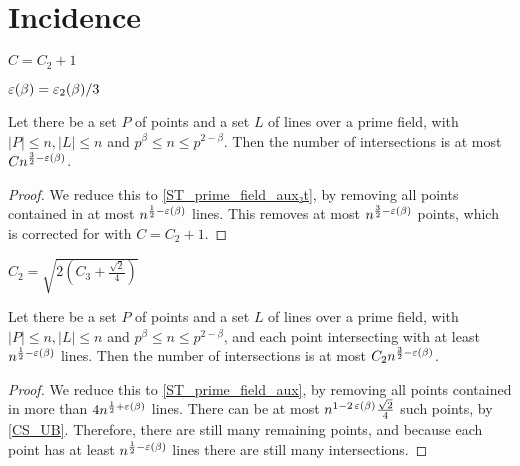 \chapter{Incidence}
\label{chap:inc}

\begin{definition}
    \label{ST_C}
    \leanok
    $C = C_2 + 1$
\end{definition}

\begin{definition}
    \label{ST_prime_field_eps}
    \leanok
    $\operatorname{\varepsilon}(\beta) = \operatorname{\varepsilon_2}(\beta) / 3$
\end{definition}

\begin{theorem}
    \label{ST_prime_field}
    \leanok
    Let there be a set $P$ of points and a set $L$ of lines over a prime field, 
    with $|P| \leq n, |L| \leq n$ and $p^\beta \leq n \leq p^{2 - \beta}$.
    Then the number of intersections is at most $ C n^{\frac32 - \operatorname{\varepsilon}(\beta)} $.
\end{theorem}

\begin{proof}
    \leanok
    We reduce this to \ref{ST_prime_field_aux₂t}, by removing all points contained in at most
    $n^{\frac12 - \operatorname{\varepsilon}(\beta)}$ lines. This removes at most $n^{\frac32 - \operatorname{\varepsilon}(\beta)}$
    points, which is corrected for with $C = C_2 + 1$.
\end{proof}

\begin{definition}
    \label{ST_C2}
    \leanok
    $C_2 = \sqrt{2(C_3 + \frac{\sqrt2}4)}$
\end{definition}

\begin{theorem}
    \label{ST_prime_field_aux₂t}
    \leanok
    Let there be a set $P$ of points and a set $L$ of lines over a prime field, 
    with $|P| \leq n, |L| \leq n$ and $p^\beta \leq n \leq p^{2 - \beta}$,
    and each point intersecting with at least $n^{\frac12 - \operatorname{\varepsilon}(\beta)}$ lines.
    Then the number of intersections is at most $C_2 n^{\frac32 - \operatorname{\varepsilon}(\beta)}$.
\end{theorem}

\begin{proof}
    \leanok
    We reduce this to \ref{ST_prime_field_aux}, by removing all points contained in more than 
    $4 n^{\frac12 + \operatorname{\varepsilon}(\beta)}$ lines. There can be at most
    $n^{1 - 2 \operatorname{\varepsilon}(\beta)} \frac{\sqrt2}4$ such points, by \ref{CS_UB}.
    Therefore, there are still many remaining points, and because each point has at least
    $n^{\frac12 - \operatorname{\varepsilon}(\beta)}$ lines there are still many intersections.
\end{proof}

